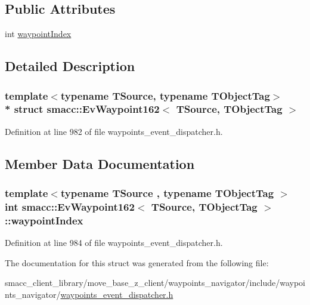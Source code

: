 \subsection*{Public Attributes}
\begin{DoxyCompactItemize}
\item 
int \hyperlink{structsmacc_1_1EvWaypoint162_ad860aae2a71d60a4cae106e92fd02b40}{waypoint\+Index}
\end{DoxyCompactItemize}


\subsection{Detailed Description}
\subsubsection*{template$<$typename T\+Source, typename T\+Object\+Tag$>$\\*
struct smacc\+::\+Ev\+Waypoint162$<$ T\+Source, T\+Object\+Tag $>$}



Definition at line 982 of file waypoints\+\_\+event\+\_\+dispatcher.\+h.



\subsection{Member Data Documentation}
\subsubsection[{\texorpdfstring{waypoint\+Index}{waypointIndex}}]{\setlength{\rightskip}{0pt plus 5cm}template$<$typename T\+Source , typename T\+Object\+Tag $>$ int {\bf smacc\+::\+Ev\+Waypoint162}$<$ T\+Source, T\+Object\+Tag $>$\+::waypoint\+Index}\hypertarget{structsmacc_1_1EvWaypoint162_ad860aae2a71d60a4cae106e92fd02b40}{}\label{structsmacc_1_1EvWaypoint162_ad860aae2a71d60a4cae106e92fd02b40}


Definition at line 984 of file waypoints\+\_\+event\+\_\+dispatcher.\+h.



The documentation for this struct was generated from the following file\+:\begin{DoxyCompactItemize}
\item 
smacc\+\_\+client\+\_\+library/move\+\_\+base\+\_\+z\+\_\+client/waypoints\+\_\+navigator/include/waypoints\+\_\+navigator/\hyperlink{waypoints__event__dispatcher_8h}{waypoints\+\_\+event\+\_\+dispatcher.\+h}\end{DoxyCompactItemize}
